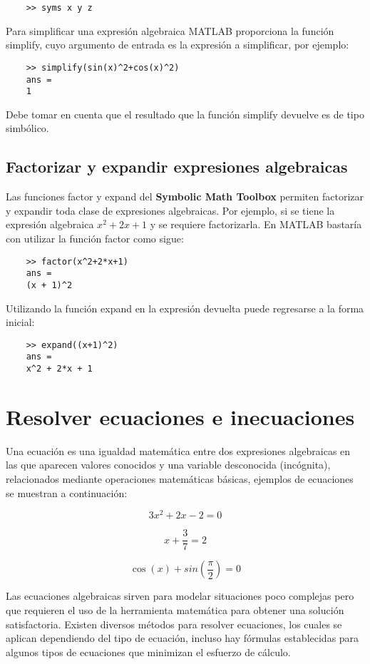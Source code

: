 \begin{verbatim}
	>> syms x y z
\end{verbatim}

Para simplificar una expresión algebraica MATLAB proporciona la función simplify, cuyo 
argumento de entrada es la expresión a simplificar, por ejemplo:

\begin{verbatim}
	>> simplify(sin(x)^2+cos(x)^2)
	ans =
	1
\end{verbatim}

Debe tomar en cuenta que el resultado que la función simplify devuelve es de  tipo simbólico.

\subsection{Factorizar y expandir  expresiones algebraicas}

Las funciones factor y expand del \textbf{Symbolic Math Toolbox} permiten factorizar y 
expandir toda clase de expresiones algebraicas. Por ejemplo, si se tiene la expresión 
algebraica $ x^2+2x+1 $ y se requiere factorizarla. En MATLAB bastaría con utilizar 
la función factor como sigue:

\begin{verbatim}
	>> factor(x^2+2*x+1)
	ans =
	(x + 1)^2
\end{verbatim}

Utilizando la función expand en la expresión devuelta puede regresarse a la forma inicial:

\begin{verbatim}
	>> expand((x+1)^2)
	ans =
	x^2 + 2*x + 1
\end{verbatim}

\section{Resolver ecuaciones e inecuaciones}

Una ecuación es una igualdad matemática entre dos expresiones algebraicas en las que 
aparecen valores conocidos y una variable desconocida (incógnita), relacionados mediante 
operaciones matemáticas básicas, ejemplos de ecuaciones se muestran a continuación:

$$3x^2+2x-2=0$$

$$x+\frac{3}{7}=2$$

$$\cos(x)+sin(\frac{\pi}{2})=0$$

Las ecuaciones algebraicas sirven para modelar situaciones poco complejas pero que 
requieren el uso de la herramienta matemática para obtener una solución satisfactoria. 
Existen diversos métodos para resolver ecuaciones, los cuales se aplican dependiendo 
del tipo de ecuación, incluso hay fórmulas establecidas para algunos tipos de ecuaciones 
que minimizan el esfuerzo de cálculo.\\

